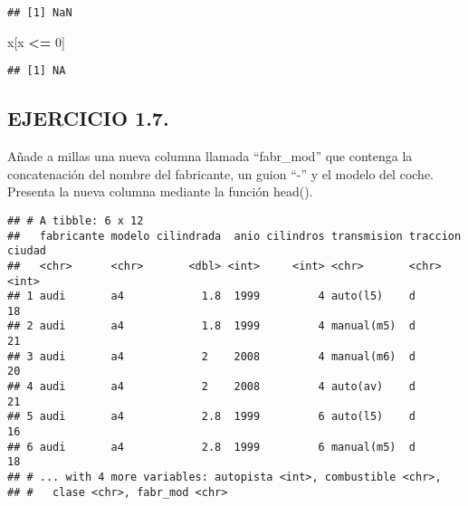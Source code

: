 \documentclass[]{article}
\newenvironment{Shaded}{\begin{snugshade}}{\end{snugshade}}
\newcommand{\CommentTok}[1]{\textcolor[rgb]{0.56,0.35,0.01}{\textit{#1}}}
\newcommand{\DecValTok}[1]{\textcolor[rgb]{0.00,0.00,0.81}{#1}}
\newcommand{\KeywordTok}[1]{\textcolor[rgb]{0.13,0.29,0.53}{\textbf{#1}}}
\newcommand{\NormalTok}[1]{#1}
\newcommand{\OperatorTok}[1]{\textcolor[rgb]{0.81,0.36,0.00}{\textbf{#1}}}
\newcommand{\StringTok}[1]{\textcolor[rgb]{0.31,0.60,0.02}{#1}}
\begin{document}
\begin{verbatim}
## [1] NaN
\end{verbatim}

\begin{Shaded}
\begin{Highlighting}[]
\NormalTok{x[x }\OperatorTok{<=}\StringTok{ }\DecValTok{0}\NormalTok{]}
\end{Highlighting}
\end{Shaded}

\begin{verbatim}
## [1] NA
\end{verbatim}

\hypertarget{ejercicio-1.7.}{%
\subsection{EJERCICIO 1.7.}\label{ejercicio-1.7.}}

Añade a millas una nueva columna llamada ``fabr\_mod'' que contenga la
concatenación del nombre del fabricante, un guion ``-'' y el modelo del
coche. Presenta la nueva columna mediante la función head().

\begin{Shaded}
\end{Shaded}

\begin{verbatim}
## # A tibble: 6 x 12
##   fabricante modelo cilindrada  anio cilindros transmision traccion ciudad
##   <chr>      <chr>       <dbl> <int>     <int> <chr>       <chr>     <int>
## 1 audi       a4            1.8  1999         4 auto(l5)    d            18
## 2 audi       a4            1.8  1999         4 manual(m5)  d            21
## 3 audi       a4            2    2008         4 manual(m6)  d            20
## 4 audi       a4            2    2008         4 auto(av)    d            21
## 5 audi       a4            2.8  1999         6 auto(l5)    d            16
## 6 audi       a4            2.8  1999         6 manual(m5)  d            18
## # ... with 4 more variables: autopista <int>, combustible <chr>,
## #   clase <chr>, fabr_mod <chr>
\end{verbatim}
\end{document}
